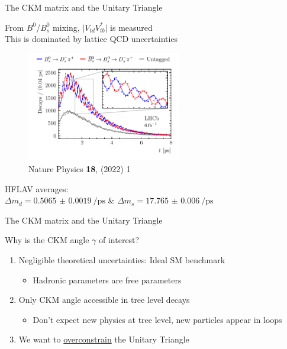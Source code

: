 \documentclass[dvipsnames]{beamer}
\begin{document}
\begin{frame}{The CKM matrix and the Unitary Triangle}
  \begin{center}
    \Large From $B^0$/$B^0_s$ mixing, $\lvert V_{td}^{\phantom{*}}V_{tb}^*\rvert$ is measured\\
    \large This is dominated by lattice QCD uncertainties
  \end{center}
  \vspace{-0.3cm}
  \begin{figure}
    \centering
    \includegraphics[width = 0.6\textwidth]{Plots/Bs_mixing.pdf}
    \vspace{-0.8cm}
    \caption*{\tiny Nature Physics \textbf{18}, (2022) 1}
  \end{figure}
  \vspace{-0.8cm}
  \begin{center}
    \Large HFLAV averages:\\
    \large $\Delta m_d = \SI{0.5065(19)}{\per\pico\second}$ \& $\Delta m_s = \SI{17.765(6)}{\per\pico\second}$
  \end{center}
\end{frame}

\begin{frame}{The CKM matrix and the Unitary Triangle}
  \begin{center}
    {\Large Why is the CKM angle $\gamma$ of interest?}
  \end{center}
  \vspace{0.85cm}
  \begin{enumerate}
    \setlength\itemsep{1.3em}
    \item{Negligible theoretical uncertainties: Ideal SM benchmark}
    \begin{itemize}
      \item{Hadronic parameters are free parameters}
    \end{itemize}
    \item{Only CKM angle accessible in tree level decays}
    \begin{itemize}
      \item{Don't expect new physics at tree level, new particles appear in loops}
    \end{itemize}
    \item{We want to \underline{overconstrain} the Unitary Triangle}
  \end{enumerate}
  \vspace{1.0cm}
\end{frame}
\end{document}
